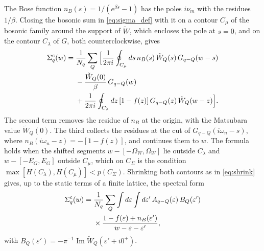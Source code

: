 \documentclass[aps,prb,reprint,a4paper]{revtex4-2}
\DeclareMathOperator{\Imag}{Im}
\begin{document}
The Bose function $n_B(s)=1/(e^{\beta s}-1)$ has the poles $i\nu_m$ with the residues $1/\beta$. Closing the bosonic sum in \eqref{eq:sigma_def} with it on a contour $C_\mu$ of the bosonic family around the support of $\tilde W$, which encloses the pole at $s=0$, and on the contour $C_\lambda$ of $G$, both counterclockwise, gives
\begin{equation}
  \begin{aligned}
  \Sigma^{\rm c}_q(w)={}&\frac1{N_q}\sum_Q\Big[\frac1{2\pi i}\oint_{C_\mu}ds\,n_B(s)\,\tilde W_Q(s)\,G_{q-Q}(w-s)\\
  &-\frac{\tilde W_Q(0)}{\beta}\,G_{q-Q}(w)\\
  &+\frac1{2\pi i}\oint_{C_\lambda}dz\,[1-f(z)]\,G_{q-Q}(z)\,\tilde W_Q(w-z)\Big].
  \end{aligned}
  \label{eq:sigma_contour}
\end{equation}
The second term removes the residue of $n_B$ at the origin, with the Matsubara value $\tilde W_Q(0)$. The third collects the residues at the cut of $G_{q-Q}(i\omega_n-s)$, where $n_B(i\omega_n-z)=-[1-f(z)]$, and continues them to $w$. The formula holds when the shifted segments $w-[-\Omega_W,\Omega_W]$ lie outside $C_\lambda$ and $w-[-E_G,E_G]$ outside $C_\mu$, which on $C_\Sigma$ is the condition $\max[H(C_\lambda),H(C_\mu)]<p(C_\Sigma)$. Shrinking both contours as in \eqref{eq:shrink} gives, up to the static terms of a finite lattice, the spectral form
\begin{equation}
  \begin{aligned}
  \Sigma^{\rm c}_q(w)={}&\frac1{N_q}\sum_Q\int d\varepsilon\int d\varepsilon'\,A_{q-Q}(\varepsilon)\,B_Q(\varepsilon')\\
  &\times\frac{1-f(\varepsilon)+n_B(\varepsilon')}{w-\varepsilon-\varepsilon'},
  \end{aligned}
  \label{eq:sigma_spectral}
\end{equation}
with $B_Q(\varepsilon')=-\pi^{-1}\Imag\tilde W_Q(\varepsilon'+i0^+)$.
\end{document}
